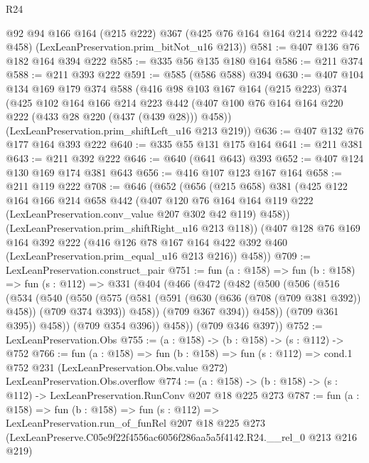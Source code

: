 \begin{lexlean}{R24}
\begin{coremodule}
      @92
      @94
      @166
      @164
      (@215 @222)
      @367
      (@425 @76 @164 @164 @214 @222 @442 @458)
      (LexLeanPreservation.prim_bitNot_u16 @213))
@581 := @407 @136 @76 @182 @164 @394 @222
@585 := @335 @56 @135 @180 @164
@586 := @211 @374
@588 := @211 @393 @222
@591 := @585 (@586 @588) @394
@630 := @407
    @104
    @134
    @169
    @179
    @374
    @588
    (@416
      @98
      @103
      @167
      @164
      (@215 @223)
      @374
      (@425
        @102
        @164
        @166
        @214
        @223
        @442
        (@407 @100 @76 @164 @164 @220 @222 (@433 @28 @220 (@437 (@439 @28))) @458))
      (LexLeanPreservation.prim_shiftLeft_u16 @213 @219))
@636 := @407 @132 @76 @177 @164 @393 @222
@640 := @335 @55 @131 @175 @164
@641 := @211 @381
@643 := @211 @392 @222
@646 := @640 (@641 @643) @393
@652 := @407 @124 @130 @169 @174 @381 @643
@656 := @416 @107 @123 @167 @164
@658 := @211 @119 @222
@708 := @646
    (@652
      (@656
        (@215 @658)
        @381
        (@425
          @122
          @164
          @166
          @214
          @658
          @442
          (@407
            @120
            @76
            @164
            @164
            @119
            @222
            (LexLeanPreservation.conv_value @207 @302 @42 @119)
            @458))
        (LexLeanPreservation.prim_shiftRight_u16 @213 @118))
      (@407
        @128
        @76
        @169
        @164
        @392
        @222
        (@416 @126 @78 @167 @164 @422 @392 @460 (LexLeanPreservation.prim_equal_u16 @213 @216))
        @458))
@709 := LexLeanPreservation.construct_pair
@751 := fun (a : @158) =>
  fun (b : @158) =>
  fun (s : @112) =>
  @331
    (@404
      (@466
        (@472
          (@482
            (@500
              (@506
                (@516
                  (@534
                    (@540
                      (@550
                        (@575
                          (@581
                            (@591 (@630 (@636 (@708 (@709 @381 @392)) @458)) (@709 @374 @393))
                            @458))
                        (@709 @367 @394))
                      @458))
                  (@709 @361 @395))
                @458))
            (@709 @354 @396))
          @458))
      (@709 @346 @397))
@752 := LexLeanPreservation.Obs
@755 := (a : @158) -> (b : @158) -> (s : @112) -> @752
@766 := fun (a : @158) =>
  fun (b : @158) =>
  fun (s : @112) =>
  cond.{1} @752 @231 (LexLeanPreservation.Obs.value @272) LexLeanPreservation.Obs.overflow
@774 := (a : @158) -> (b : @158) -> (s : @112) -> LexLeanPreservation.RunConv @207 @18 @225 @273
@787 := fun (a : @158) =>
  fun (b : @158) =>
  fun (s : @112) =>
  LexLeanPreservation.run_of_funRel
    @207
    @18
    @225
    @273
    (LexLeanPreserve.C05e9f22f4556ac6056f286aa5a5f4142.R24.__rel_0 @213 @216 @219)
\end{coremodule}
\end{lexlean}
